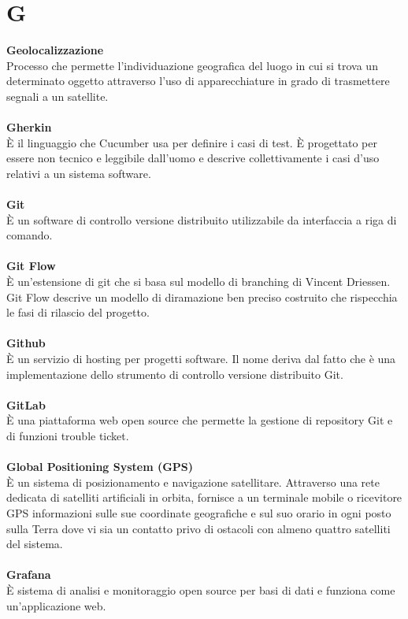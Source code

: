 \section{G}
\textbf{Geolocalizzazione}\\
Processo che permette l'individuazione geografica del luogo in cui si trova un determinato oggetto attraverso l'uso di apparecchiature in grado di trasmettere segnali a un satellite. \\ \\
\textbf{Gherkin}\\
È il linguaggio che Cucumber usa per definire i casi di test. È progettato per essere non tecnico e leggibile dall'uomo e descrive collettivamente i casi d'uso relativi a un sistema software. \\ \\
\textbf{Git}\\
È un software di controllo versione distribuito utilizzabile da interfaccia a riga di comando. \\ \\
\textbf{Git Flow}\\
È un’estensione di git che si basa sul modello di branching di Vincent Driessen. Git Flow descrive un modello di diramazione ben preciso costruito che rispecchia le fasi di rilascio del progetto.\\ \\
\textbf{Github}\\
È un servizio di hosting per progetti software. Il nome deriva dal fatto che è una implementazione dello strumento di controllo versione distribuito Git. \\ \\
\textbf{GitLab}\\
È una piattaforma web open source che permette la gestione di repository Git e di funzioni trouble ticket. \\ \\
\textbf{Global Positioning System (GPS)}\\
È un sistema di posizionamento e navigazione satellitare. Attraverso una rete dedicata di satelliti artificiali in orbita, fornisce a un terminale mobile o ricevitore GPS informazioni sulle sue coordinate geografiche e sul suo orario in ogni posto sulla Terra dove vi sia un contatto privo di ostacoli con almeno quattro satelliti del sistema. \\ \\
\textbf{Grafana}\\
È sistema di analisi e monitoraggio open source per basi di dati e funziona come un'applicazione web. \\ \\
\clearpage